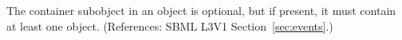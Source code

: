 The \ListOfEventAssignments container subobject in an \Event object is
optional, but if present, it must contain at least one \EventAssignment
object.  (References: SBML L3V1 Section~\ref{sec:events}.)
